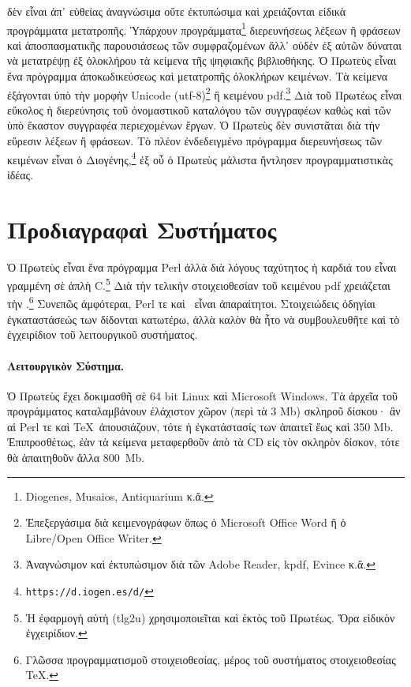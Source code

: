 \documentclass[12pt,a4paper]{article}
\begin{document}
  δὲν εἶναι ἀπ᾽ εὐθείας ἀναγνώσιμα οὔτε ἐκτυπώσιμα καὶ χρειάζονται
  εἰδικὰ προγράμματα μετατροπῆς. Ὑπάρχουν
  προγράμματα\footnote{Diogenes, Musaios, Antiquarium κ.ἄ.}
  διερευνήσεως λέξεων ἢ φράσεων καὶ
  ἀποσπασματικῆς παρουσιάσεως τῶν συμφραζομένων ἄλλ᾽ οὐδὲν ἐξ αὐτῶν δύναται
  νὰ μετατρέψῃ ἐξ ὁλοκλήρου τὰ κείμενα τῆς ψηφιακῆς βιβλιοθήκης.
  Ὁ Πρωτεὺς εἶναι ἕνα πρόγραμμα ἀποκωδικεύσεως καὶ μετατροπῆς ὁλοκλήρων
  κειμένων. Τὰ κείμενα ἐξάγονται ὑπὸ τὴν μορφὴν Unicode
  (utf-8)\footnote{Ἐπεξεργάσιμα διὰ κειμενογράφων ὅπως ὁ Microsoft
  Office Word ἢ ὁ Libre/Open Office Writer.} ἢ κειμένου pdf.\footnote{Ἀναγνώσιμον
  καὶ ἐκτυπώσιμον διὰ τῶν Adobe Reader, kpdf, Evince κ.ἄ.} Διὰ τοῦ Πρωτέως
  εἶναι εὔκολος ἡ διερεύνησις τοῦ ὀνομαστικοῦ καταλόγου τῶν συγγραφέων
  καθὼς καὶ τῶν ὑπὸ ἕκαστον συγγραφέα περιεχομένων ἔργων.
  Ὁ Πρωτεὺς δὲν συνιστᾶται διὰ τὴν εὕρεσιν λέξεων ἢ φράσεων. Τὸ πλέον
  ἐνδεδειγμένο πρόγραμμα διερευνήσεως τῶν κειμένων εἶναι ὁ
  Διογένης,\footnote{\tt https://d.iogen.es/d/}
  ἐξ οὗ ὁ Πρωτεὺς μάλιστα ἤντλησεν προγραμματιστικὰς ἰδέας.
\newpage
\section{Προδιαγραφαὶ Συστήματος}
  Ὁ Πρωτεὺς εἶναι ἕνα πρόγραμμα Perl
  ἀλλὰ διὰ λόγους ταχύτητος ἡ καρδιά του εἶναι γραμμένη
  σὲ ἁπλὴ C.\footnote{Ἡ ἐφαρμογὴ αὐτὴ (tlg2u) χρησιμοποιεῖται
              καὶ ἐκτὸς τοῦ Πρωτέως. Ὅρα εἰδικὸν ἐγχειρίδιον.}
  Διὰ τὴν τελικὴν στοιχειοθεσίαν τοῦ κειμένου pdf
  χρειάζεται τὴν \XeTeX.\footnote{Γλῶσσα προγραμματισμοῦ στοιχειοθεσίας,
                                    μέρος τοῦ συστήματος στοιχειοθεσίας
                                    \TeX.}
  Συνεπῶς ἀμφότεραι, Perl τε καὶ \XeTeX\, εἶναι ἀπαραίτητοι.
  Στοιχειώδεις ὁδηγίαι ἐγκαταστάσεώς των δίδονται
  κατωτέρω, ἀλλὰ καλὸν θὰ ἦτο νὰ συμβουλευθῆτε καὶ τὸ ἐγχειρίδιον τοῦ
  λειτουργικοῦ συστήματος.
  \paragraph{Λειτουργικὸν Σύστημα.}
    Ὁ Πρωτεὺς ἔχει δοκιμασθῆ σὲ 64 bit Linux καὶ\newline
    Microsoft Windows. Τὰ ἀρχεῖα τοῦ προγράμματος καταλαμβάνουν ἐλάχιστον χῶρον (περὶ τὰ 3 Mb)
    σκληροῦ δίσκου· ἂν αἱ Perl τε καὶ \TeX\ ἀπουσιάζουν, τότε ἡ ἐγκατάστασίς
    των ἀπαιτεῖ ἕως καὶ 350 Mb.  Ἐπιπροσθέτως, ἐὰν τὰ κείμενα μεταφερθοῦν
    ἀπὸ τὰ CD εἰς τὸν σκληρὸν δίσκον, τότε θὰ ἀπαιτηθοῦν ἄλλα
    800\nolinebreak\ Mb.
\end{document}
